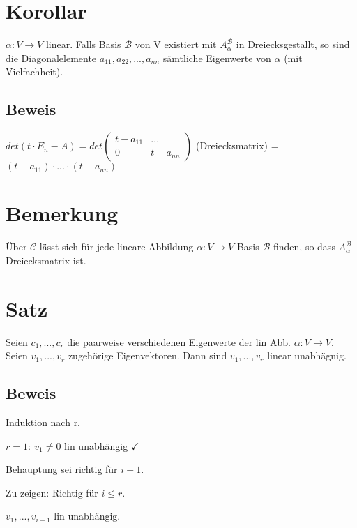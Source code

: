 \documentclass[a4paper, openany]{book}
\begin{document}
        \section{Korollar}

        $\alpha : V \rightarrow V$ linear. Falls Basis $\mathcal{B}$ von V existiert mit $A_{\alpha}^{\mathcal{B}}$ in Dreiecksgestallt, so sind die Diagonalelemente $a_{11}, a_{22}, ..., a_{nn}$ sämtliche Eigenwerte von $\alpha$ (mit Vielfachheit).

        \subsection{Beweis}

        $det(t \cdot E_n -A) = det \begin{pmatrix}t - a_{11} & ...  \\ 0 & t-a_{nn} \end{pmatrix}$ (Dreiecksmatrix) = $(t-a_{11}) \cdot ... \cdot (t-a_{nn})$ 

        \section{Bemerkung}

        Über $\mathcal{C}$ lässt sich für jede lineare Abbildung $\alpha : V \rightarrow V$ Basis $\mathcal{B}$ finden, so dass $A_{\alpha}^{\mathcal{B}}$ Dreiecksmatrix ist.


        \section{Satz}

        Seien $c_1, ..., c_r$ die paarweise verschiedenen Eigenwerte der lin Abb. $\alpha : V \rightarrow V$. Seien $v_1, ..., v_r$ zugehörige Eigenvektoren. Dann sind $v_1, ..., v_r$ linear unabhägnig. 

        \subsection{Beweis}

        Induktion nach r.

        $r = 1: \ v_1 \neq 0$ lin unabhängig $\checkmark$

        Behauptung sei richtig für $i-1$.

        Zu zeigen: Richtig für $i \le r$. 

        $v_1, ..., v_{i-1}$ lin unabhängig.
\end{document}
